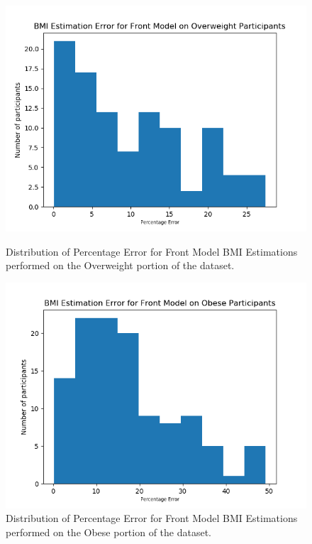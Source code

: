 \documentclass[conference]{IEEEtran}
\begin{document}
\begin{figure}[H]
    \centering
    \begin{minipage}[b]{0.35\textwidth}
    \includegraphics[width=\linewidth]{frontovererror.png}
    \caption{Distribution of Percentage Error for Front Model BMI Estimations performed on the Overweight portion of the dataset.}
    \label{fig:frontovererror}
    \end{minipage}
    \hspace{1cm}
    \begin{minipage}[b]{0.35\textwidth}
    \includegraphics[width=\linewidth]{frontobeseerror.png}
    \caption{Distribution of Percentage Error for Front Model BMI Estimations performed on the Obese portion of the dataset.}
    \label{fig:frontobeseerror}
    \end{minipage}
\end{figure}
\end{document}
